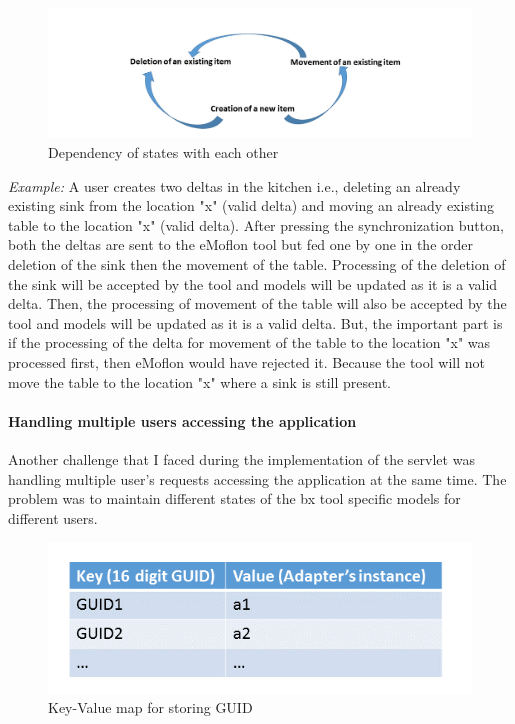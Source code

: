 \begin{figure}
	\includegraphics[width=1\textwidth]{figures/State_Dependency}
	\caption{Dependency of states with each other}
	\label{fig:State_Dependency}
\end{figure}

\textit{Example:} A user creates two deltas in the kitchen i.e., deleting an already existing sink from the location "x" (valid delta) and moving an already existing table to the location "x" (valid delta). After pressing the synchronization button, both the deltas are sent to the eMoflon tool but fed one by one in the order deletion of the sink then the movement of the table. Processing of the deletion of the sink will be accepted by the tool and models will be updated as it is a valid delta. Then, the processing of movement of the table will also be accepted by the tool and models will be updated as it is a valid delta. But, the important part is if the processing of the delta for movement of the table to the location "x" was processed first, then eMoflon would have rejected it. Because the tool will not move the table to the location "x" where a sink is still present.

\paragraph{Handling multiple users accessing the application}
Another challenge that I faced during the implementation of the servlet was handling multiple user's requests accessing the application at the same time. The problem was to maintain different states of the bx tool specific models for different users. 

\begin{figure}
	\centering
	\includegraphics[width=1\textwidth]{figures/Keyvalue_map}
	\caption{Key-Value map for storing GUID}
	\label{fig:Keyvalue_map}
\end{figure}

